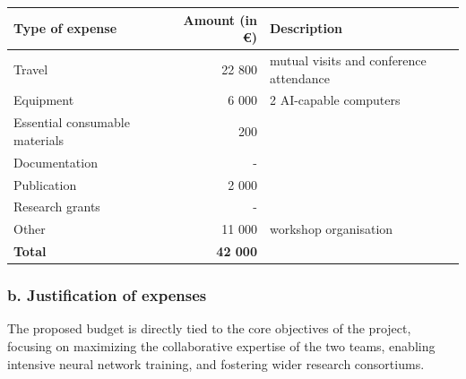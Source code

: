 \documentclass[a4paper]{article}
\begin{document}
\begin{tabular}{|l|r|l|}
\hline
Type of expense & Amount (in \euro) & Description \\
\hline
Travel & 22 800  & mutual visits and conference attendance\\
Equipment & 6 000 & 2 AI-capable computers \\
Essential consumable materials & 200 & \\
Documentation &  - & \\
Publication & 2 000 & \\
Research grants & - & \\ %
Other & 11 000 & workshop organisation\\
\hline
\bf Total & \bf 42 000 & \\
\hline
\end{tabular}


\bigskip

\subsubsection*{b. Justification of expenses}

The proposed budget is directly tied to the core objectives of the project, focusing on maximizing the collaborative expertise of the two teams, enabling intensive neural network training, and fostering wider research consortiums.
\end{document}
